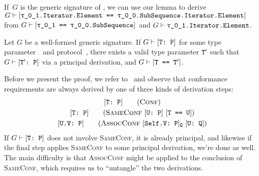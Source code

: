 \documentclass[../generics]{subfiles}
\begin{document}
\begin{example}
If~$G$ is the generic signature of , we can use our lemma to derive $G\vdash\SameReq{\rU.Iterator.Element}{\rT.SubSequence.Iterator.Element}$ from $G\vdash\SameReq{\rU}{\rT.SubSequence}$ and $G\vdash\texttt{\rU.Iterator.Element}$.
\end{example}

\newcommand{\AssocConfStepDefX}{\ConfReq{U.V}{P}\tag{\textsc{AssocConf} $\AssocConfReq{Self.V}{P}{Q}$ $\ConfReq{U}{Q}$}}

\begin{theorem}\label{conformance paths theorem} Let $G$ be a well-formed generic signature. If $G\vdash[\texttt{T:~P}]$ for some type parameter~\tT\ and protocol~\tP, there exists a valid type parameter $\texttt{T}^\prime$ such that $G\vdash[\texttt{$\texttt{T}^\prime$:~P}]$ via a principal derivation, and $G\vdash[\texttt{T == $\texttt{T}^\prime$}]$.
\end{theorem}

Before we present the proof, we refer to~ and observe that conformance requirements are always derived by one of three kinds of derivation steps:
\begin{gather*}
\ConfStepDef\\
\SameConfStepDef\\
\AssocConfStepDefX
\end{gather*}
If $G\vdash[\texttt{T:~P}]$ does not involve \textsc{SameConf}, it is already principal, and likewise if the final step applies \textsc{SameConf} to some principal derivation, we're done as well. The main difficulty is that \textsc{AssocConf} might be applied to the conclusion of \textsc{SameConf}, which requires us to ``untangle'' the two derivations.
\end{document}
